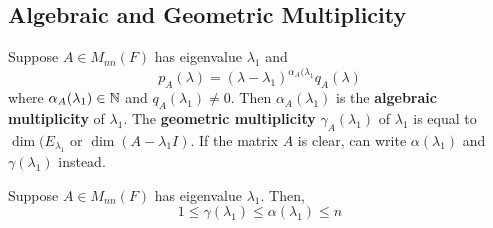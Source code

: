 \documentclass{article}
\begin{document}
\subsection{Algebraic and Geometric Multiplicity}
\begin{definition}
  Suppose $A \in M_{nn}(F)$ has eigenvalue $\lambda_1$ and \[
    p_A(\lambda) = (\lambda - \lambda_1)^{\alpha_A(\lambda_1}q_A(\lambda)
  \] where $\alpha_A(\lambda_1) \in \mathbb{N}$ and $q_A(\lambda_1) \neq 0$. Then $\alpha_A(\lambda_1)$ is the \textbf{algebraic multiplicity} of $\lambda_1$. The \textbf{geometric multiplicity} $\gamma_A(\lambda_1)$ of $\lambda_1$ is equal to $\dim(E_{\lambda_1}$ or $\dim (A - \lambda_1I)$. If the matrix $A$ is clear, can write $\alpha(\lambda_1)$ and $\gamma(\lambda_1)$ instead.
\end{definition}
\begin{theorem}
  Suppose $A \in M_{nn}(F)$ has eigenvalue $\lambda_1$. Then, \[
    1 \leq \gamma(\lambda_1) \leq \alpha(\lambda_1) \leq n
  \]
\end{theorem}
\end{document}
